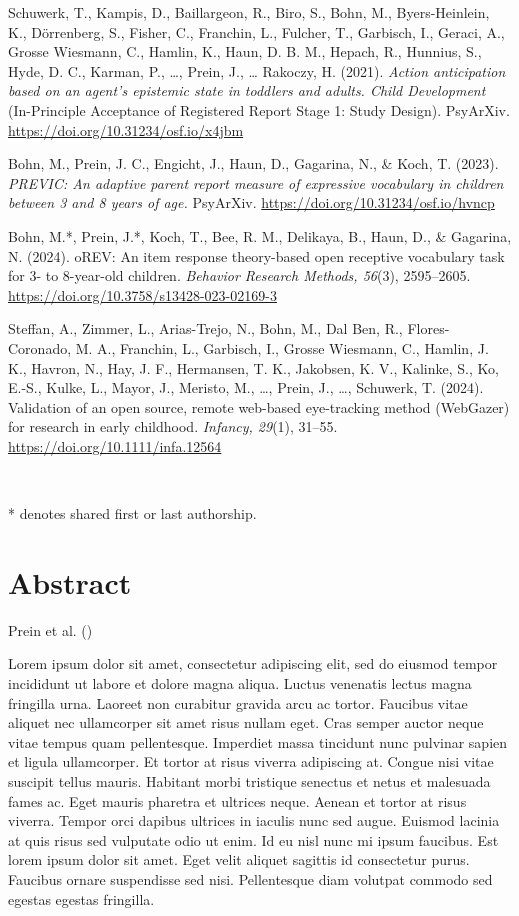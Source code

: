 \documentclass[
]{scrbook}
\begin{document}
Schuwerk, T., Kampis, D., Baillargeon, R., Biro, S., Bohn, M., Byers-Heinlein, K., Dörrenberg, S., Fisher, C., Franchin, L., Fulcher, T., Garbisch, I., Geraci, A., Grosse Wiesmann, C., Hamlin, K., Haun, D. B. M., Hepach, R., Hunnius, S., Hyde, D. C., Karman, P., \ldots, Prein, J., \ldots{} Rakoczy, H. (2021). \emph{Action anticipation based on an agent's epistemic state in toddlers and adults. Child Development} (In-Principle Acceptance of Registered Report Stage 1: Study Design). PsyArXiv. \url{https://doi.org/10.31234/osf.io/x4jbm}

Bohn, M., Prein, J. C., Engicht, J., Haun, D., Gagarina, N., \& Koch, T. (2023). \emph{PREVIC: An adaptive parent report measure of expressive vocabulary in children between 3 and 8 years of age.} PsyArXiv. \url{https://doi.org/10.31234/osf.io/hvncp}

Bohn, M.*, Prein, J.*, Koch, T., Bee, R. M., Delikaya, B., Haun, D., \& Gagarina, N. (2024). oREV: An item response theory-based open receptive vocabulary task for 3- to 8-year-old children. \emph{Behavior Research Methods, 56}(3), 2595--2605. \url{https://doi.org/10.3758/s13428-023-02169-3}

Steffan, A., Zimmer, L., Arias-Trejo, N., Bohn, M., Dal Ben, R., Flores-Coronado, M. A., Franchin, L., Garbisch, I., Grosse Wiesmann, C., Hamlin, J. K., Havron, N., Hay, J. F., Hermansen, T. K., Jakobsen, K. V., Kalinke, S., Ko, E.-S., Kulke, L., Mayor, J., Meristo, M., \ldots, Prein, J., \ldots, Schuwerk, T. (2024). Validation of an open source, remote web-based eye-tracking method (WebGazer) for research in early childhood. \emph{Infancy, 29}(1), 31--55. \url{https://doi.org/10.1111/infa.12564}

~

* denotes shared first or last authorship.

\chapter*{Abstract}\label{abstract}

Prein et al. ()

Lorem ipsum dolor sit amet, consectetur adipiscing elit, sed do eiusmod tempor incididunt ut labore et dolore magna aliqua. Luctus venenatis lectus magna fringilla urna. Laoreet non curabitur gravida arcu ac tortor. Faucibus vitae aliquet nec ullamcorper sit amet risus nullam eget. Cras semper auctor neque vitae tempus quam pellentesque. Imperdiet massa tincidunt nunc pulvinar sapien et ligula ullamcorper. Et tortor at risus viverra adipiscing at. Congue nisi vitae suscipit tellus mauris. Habitant morbi tristique senectus et netus et malesuada fames ac. Eget mauris pharetra et ultrices neque. Aenean et tortor at risus viverra. Tempor orci dapibus ultrices in iaculis nunc sed augue. Euismod lacinia at quis risus sed vulputate odio ut enim. Id eu nisl nunc mi ipsum faucibus. Est lorem ipsum dolor sit amet. Eget velit aliquet sagittis id consectetur purus. Faucibus ornare suspendisse sed nisi. Pellentesque diam volutpat commodo sed egestas egestas fringilla.
\end{document}
